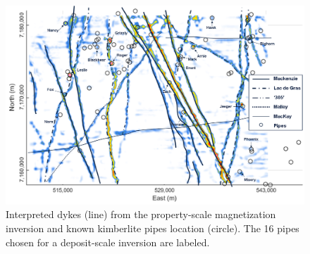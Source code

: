 \begin{figure}[h!]
\centering
\includegraphics[scale=0.58, trim= 0.5cm 0 0 0]{Ekati_Reg_geology_interp.png}
\caption{Interpreted dykes (line) from the property-scale magnetization inversion and known kimberlite pipes location (circle). The 16 pipes chosen for a deposit-scale inversion are labeled.}
\label{fig:Ekati_Reg_Interp}
\end{figure}


